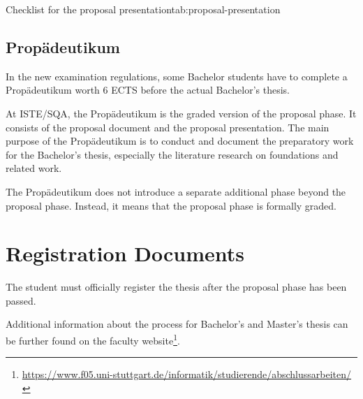 \documentclass[11pt,a4paper]{article}
\begin{document}
\begin{checklisttable}{Checklist for the proposal presentation}{tab:proposal-presentation}


\checksep
{}
\end{checklisttable}

\subsection{Prop\"adeutikum}
In the new examination regulations, some Bachelor students have to complete a Prop\"adeutikum worth 6 ECTS before the actual Bachelor's thesis.

At ISTE/SQA, the Prop\"adeutikum is the graded version of the proposal phase. It consists of the proposal document and the proposal presentation.
The main purpose of the Prop\"adeutikum is to conduct and document the preparatory work for the Bachelor's thesis, especially the literature research on foundations and related work.

The Prop\"adeutikum does not introduce a separate additional phase beyond the proposal phase.
Instead, it means that the proposal phase is formally graded.

\section{Registration Documents}
The student must officially register the thesis after the proposal phase has been passed.

Additional information about the process for Bachelor's and Master's thesis can be further found on the faculty website\footnote{\url{https://www.f05.uni-stuttgart.de/informatik/studierende/abschlussarbeiten/}}.
\end{document}
